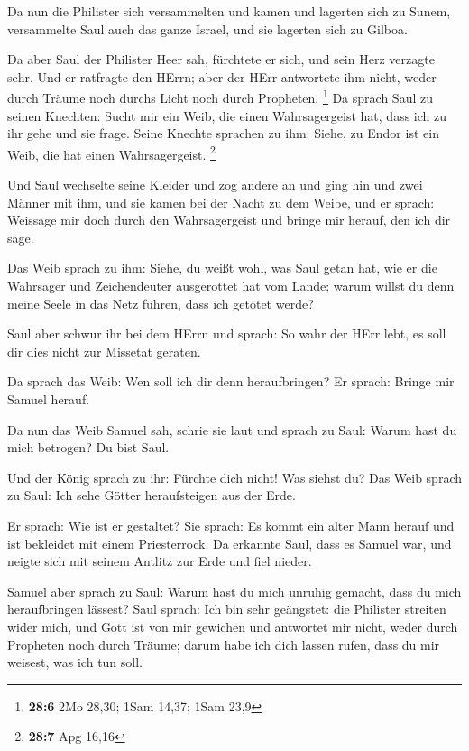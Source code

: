  Da nun die Philister sich versammelten und kamen und
lagerten sich zu Sunem, versammelte Saul auch das ganze Israel, und sie
lagerten sich zu Gilboa.

 Da aber Saul der Philister Heer sah, fürchtete er sich, und
sein Herz verzagte sehr.  Und er ratfragte den HErrn; aber
der HErr antwortete ihm nicht, weder durch Träume noch durchs Licht noch
durch Propheten. \footnote{\textbf{28:6} 2Mo 28,30; 1Sam 14,37; 1Sam
  23,9}  Da sprach Saul zu seinen Knechten: Sucht mir ein
Weib, die einen Wahrsagergeist hat, dass ich zu ihr gehe und sie frage.
Seine Knechte sprachen zu ihm: Siehe, zu Endor ist ein Weib, die hat
einen Wahrsagergeist. \footnote{\textbf{28:7} Apg 16,16}

 Und Saul wechselte seine Kleider und zog andere an und ging
hin und zwei Männer mit ihm, und sie kamen bei der Nacht zu dem Weibe,
und er sprach: Weissage mir doch durch den Wahrsagergeist und bringe mir
herauf, den ich dir sage.

 Das Weib sprach zu ihm: Siehe, du weißt wohl, was Saul
getan hat, wie er die Wahrsager und Zeichendeuter ausgerottet hat vom
Lande; warum willst du denn meine Seele in das Netz führen, dass ich
getötet werde?

 Saul aber schwur ihr bei dem HErrn und sprach: So wahr der
HErr lebt, es soll dir dies nicht zur Missetat geraten.

 Da sprach das Weib: Wen soll ich dir denn heraufbringen?
Er sprach: Bringe mir Samuel herauf.

 Da nun das Weib Samuel sah, schrie sie laut und sprach zu
Saul: Warum hast du mich betrogen? Du bist Saul.

 Und der König sprach zu ihr: Fürchte dich nicht! Was
siehst du? Das Weib sprach zu Saul: Ich sehe Götter heraufsteigen aus
der Erde.

 Er sprach: Wie ist er gestaltet? Sie sprach: Es kommt ein
alter Mann herauf und ist bekleidet mit einem Priesterrock. Da erkannte
Saul, dass es Samuel war, und neigte sich mit seinem Antlitz zur Erde
und fiel nieder.

 Samuel aber sprach zu Saul: Warum hast du mich unruhig
gemacht, dass du mich heraufbringen lässest? Saul sprach: Ich bin sehr
geängstet: die Philister streiten wider mich, und Gott ist von mir
gewichen und antwortet mir nicht, weder durch Propheten noch durch
Träume; darum habe ich dich lassen rufen, dass du mir weisest, was ich
tun soll.

